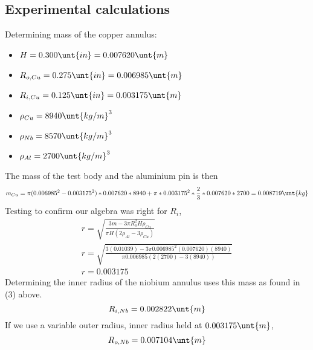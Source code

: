 \documentclass[10pt]{article}
\begin{document}
    \subsection{Experimental calculations}
    Determining mass of the copper annulus:
    \begin{itemize}
        \item $H=0.300\unt{in}=0.007620\unt{m}$
        \item $R_{o,Cu}=0.275\unt{in}=0.006985\unt{m}$
        \item $R_{i,Cu} = 0.125\unt{in}=0.003175\unt{m}$
        \item $\rho_{Cu} = 8940\unt{kg/m}^3$
        \item $\rho_{Nb} = 8570\unt{kg/m}^3$
        \item $\rho_{Al} = 2700\unt{kg/m}^3$
    \end{itemize}
    The mass of the test body and the aluminium pin is then
    \begin{displaymath}
        m_{Cu} = \pi(0.006985^2-0.003175^2)*0.007620*8940+\pi*0.003175^2*\frac{2}{3}*0.007620*2700 = 0.008719\unt{kg}
    \end{displaymath}
    Testing to confirm our algebra was right for $R_i$,
    \begin{align}
        r = \sqrt{\frac{3m-3\pi R_o^2H\rho_{Cu}}{\pi H(2\rho_{Al}-3\rho_{Cu})}}\\
        r = \sqrt{\frac{3(0.01039)-3\pi 0.006985^2(0.007620)(8940)}{\pi 0.006985(2(2700)-3(8940))}}\\
        r = 0.003175
    \end{align}
    Determining the inner radius of the niobium annulus uses this mass as found in (3) above.
    \begin{displaymath}
        R_{i,Nb} = 0.002822\unt{m}
    \end{displaymath}
    If we use a variable outer radius, inner radius held at $0.003175\unt{m}$,
    \begin{displaymath}
        R_{o,Nb} = 0.007104\unt{m}
    \end{displaymath}
\end{document}
